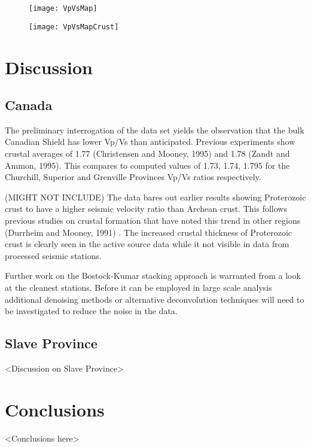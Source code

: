 \documentclass[draft, 12pt]{article}
\begin{document}
\begin{figure}
  \centering
  \texttt{[image: VpVsMap]}
  \caption{}
  \label{fig:VpVsMap}
\end{figure}

\begin{figure}
  \centering
  \texttt{[image: VpVsMapCrust]}
  \caption{}
  \label{fig:VpVsMapCrust}
\end{figure}


\section{Discussion}
\subsection{Canada}

  The preliminary interrogation of the data set yields the observation that the bulk Canadian Shield has lower Vp/Vs than anticipated. Previous experiments show crustal averages of 1.77 (Christensen and Mooney, 1995) and 1.78 (Zandt and Ammon, 1995). This compares to computed values of 1.73, 1.74, 1.795 for the Churchill, Superior and Grenville Provinces Vp/Vs ratios respectively.


(MIGHT NOT INCLUDE)  The data bares out earlier results showing Proterozoic crust to have a higher seismic velocity ratio than Archean crust. This follows previous studies on crustal formation that have noted this trend in other regions (Durrheim and Mooney, 1991) . The increased crustal thickness of Proterozoic crust is clearly seen in the active source data while it not visible in data from processed seismic stations.

  Further work on the Bostock-Kumar stacking approach is warranted from a look at the cleanest stations. Before it can be employed in large scale analysis additional denoising methods or alternative deconvolution techniques will need to be investigated to reduce the noise in the data.


\subsection{Slave Province}
<Discussion on Slave Province>

\section{Conclusions}
<Conclusions here>
\end{document}
